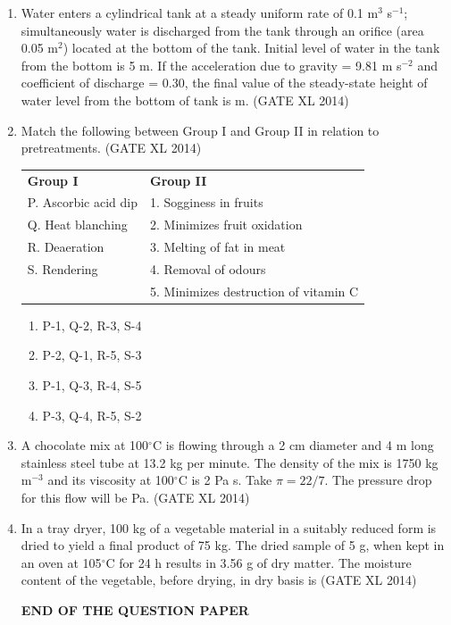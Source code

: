 \documentclass[journal,12pt,onecolumn]{IEEEtran}
\theoremstyle{remark}
\begin{document}
\begin{enumerate}
\item Water enters a cylindrical tank at a steady uniform rate of 0.1 m$^3$ s$^{-1}$; simultaneously water is discharged from the tank through an orifice (area 0.05 m$^2$) located at the bottom of the tank. Initial level of water in the tank from the bottom is 5 m. If the acceleration due to gravity = 9.81 m s$^{-2}$ and coefficient of discharge = 0.30, the final value of the steady-state height of water level from the bottom of tank is \underline{\hspace{3cm}} m.
\hfill (GATE XL 2014)\\

\item Match the following between Group I and Group II in relation to pretreatments.
\hfill (GATE XL 2014)\\

\begin{tabular}{ll}
\textbf{Group I} & \textbf{Group II} \\
P. Ascorbic acid dip & 1. Sogginess in fruits \\
Q. Heat blanching & 2. Minimizes fruit oxidation \\
R. Deaeration & 3. Melting of fat in meat \\
S. Rendering & 4. Removal of odours \\
& 5. Minimizes destruction of vitamin C \\
\end{tabular}

\begin{multicols}{2}
\begin{enumerate}
\item P-1, Q-2, R-3, S-4
\item P-2, Q-1, R-5, S-3
\item P-1, Q-3, R-4, S-5
\item P-3, Q-4, R-5, S-2
\end{enumerate}
\end{multicols}


\item A chocolate mix at 100$^\circ$C is flowing through a 2 cm diameter and 4 m long stainless steel tube at 13.2 kg per minute. The density of the mix is 1750 kg m$^{-3}$ and its viscosity at 100$^\circ$C is 2 Pa s. Take $\pi = 22/7$. The pressure drop for this flow will be \underline{\hspace{3cm}} Pa.
\hfill (GATE XL 2014)\\


\item In a tray dryer, 100 kg of a vegetable material in a suitably reduced form is dried to yield a final product of 75 kg. The dried sample of 5 g, when kept in an oven at 105$^\circ$C for 24 h results in 3.56 g of dry matter. The moisture content of the vegetable, before drying, in dry basis is \underline{\hspace{3cm}}%
\hfill (GATE XL 2014)\\

\begin{center}
    \textbf{END OF THE QUESTION PAPER}
\end{center}

\end{enumerate}
\end{document}
